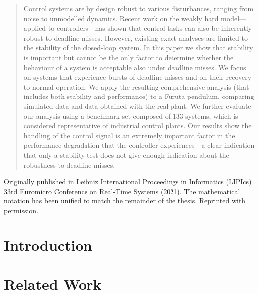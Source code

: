 \renewcommand\thisdir{papers/ecrts21}
\renewcommand\figdir{\thisdir/figs}




\begin{abstract}
    Control systems are by design robust to various disturbances, ranging from noise to unmodelled dynamics.
    Recent work on the weakly hard model---applied to controllers---has shown that control tasks can also be inherently robust to deadline misses.
    However, existing exact analyses are limited to the stability of the closed-loop system.
    In this paper we show that stability is important but cannot be the only factor to determine whether the behaviour of a system is acceptable also under deadline misses.
    We focus on systems that experience bursts of deadline misses and on their recovery to normal operation.
    We apply the resulting comprehensive analysis (that includes both stability and performance) to a Furuta pendulum, comparing simulated data and data obtained with the real plant.
    We further evaluate our analysis using a benchmark set composed of 133 systems, which is considered representative of industrial control plants.
    Our results show the handling of the control signal is an extremely important factor in the performance degradation that the controller experiences---a clear indication that only a stability test does not give enough indication about the robustness to deadline misses.
\end{abstract}

\vfill
Originally published in Leibniz International Proceedings in Informatics (LIPIcs) 33rd Euromicro Conference on Real-Time Systems (2021).
The mathematical notation has been unified to match the remainder of the thesis.
Reprinted with permission.
\newpage

\section{Introduction}
\label{sec:intro}


\section{Related Work}
\label{sec:related}


